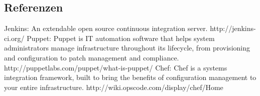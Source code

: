 \documentclass{article}
\begin{document}
\subsection{Referenzen}

\begin{thebibliography}{9}

  Jenkins: An extendable open source continuous integration server.
  http://jenkins-ci.org/
  Puppet: Puppet is IT automation software that helps system administrators manage infrastructure throughout its lifecycle, 
  from provisioning and configuration to patch management and compliance.
  http://puppetlabs.com/puppet/what-is-puppet/
  Chef: Chef is a systems integration framework, built to bring the benefits of configuration management to your entire infrastructure.
  http://wiki.opscode.com/display/chef/Home
  
\end{thebibliography}
\end{document}

